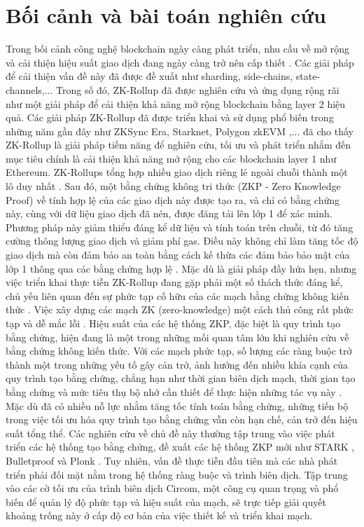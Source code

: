 \section{Bối cảnh và bài toán nghiên cứu}
Trong bối cảnh công nghệ blockchain ngày càng phát triển, nhu cầu về mở rộng \cite{song2024advancing} và cải thiện hiệu suất giao dịch đang ngày càng trở nên cấp thiết  \cite{etherscan_pending} \cite{etherscan_token}. Các giải pháp để cải thiện vấn đề này đã được đề xuất như sharding, side-chains, state-channels,... Trong số đó, ZK-Rollup đã được nghiên cứu và ứng dụng rộng rãi như một giải pháp để cải thiện khả năng mở rộng blockchain bằng layer 2 hiệu quả. Các giải pháp ZK-Rollup đã được triển khai và sử dụng phổ biến trong những năm gần đây như ZKSync Era, Starknet, Polygon zkEVM \cite{chaliasos2024analyzing},... đã cho thấy ZK-Rollup là giải pháp tiềm năng để nghiên cứu, tối ưu và phát triển nhắm đến mục tiêu chính là cải thiện khả năng mở rộng cho các blockchain layer 1 như Ethereum.
ZK-Rollups tổng hợp nhiều giao dịch riêng lẻ ngoài chuỗi thành một lô duy nhất \cite{thibault2022blockchain}. Sau đó, một bằng chứng không tri thức (ZKP - Zero Knowledge Proof) về tính hợp lệ của các giao dịch này được tạo ra, và chỉ có bằng chứng này, cùng với dữ liệu giao dịch đã nén, được đăng tải lên lớp 1 để xác minh. Phương pháp này giảm thiểu đáng kể dữ liệu và tính toán trên chuỗi, từ đó tăng cường thông lượng giao dịch và giảm phí gas. Điều này không chỉ làm tăng tốc độ giao dịch mà còn đảm bảo an toàn bằng cách kế thừa các đảm bảo bảo mật của lớp 1 thông qua các bằng chứng hợp lệ \cite{saif2024survey}.
Mặc dù là giải pháp đầy hứa hẹn, nhưng việc triển khai thực tiễn ZK-Rollup đang gặp phải một số thách thức đáng kể, chủ yếu liên quan đến sự phức tạp cố hữu của các mạch bằng chứng không kiến thức \cite{zhou2024leveraging}. Việc xây dựng các mạch ZK (zero-knowledge) một cách thủ công rất phức tạp và dễ mắc lỗi \cite{chaliasos2024sok}. Hiệu suất của các hệ thống ZKP, đặc biệt là quy trình tạo bằng chứng, hiện đang là một trong những mối quan tâm lớn khi nghiên cứu về bằng chứng không kiến thức. Với các mạch phức tạp, số lượng các ràng buộc trở thành một trong những yếu tố gây cản trở, ảnh hưởng đến nhiều khía cạnh của quy trình tạo bằng chứng, chẳng hạn như thời gian biên dịch mạch, thời gian tạo bằng chứng và mức tiêu thụ bộ nhớ cần thiết để thực hiện những tác vụ này \cite{belles2022circom}.
Mặc dù đã có nhiều nỗ lực nhằm tăng tốc tính toán bằng chứng, những tiến bộ trong việc tối ưu hóa quy trình tạo bằng chứng vẫn còn hạn chế, cản trở đến hiệu suất tổng thể. Các nghiên cứu về chủ đề này thường tập trung vào việc phát triển các hệ thống tạo bằng chứng, đề xuất các hệ thống ZKP mới \cite{gong2022analysis} như STARK \cite{ben2018scalable}, Bulletproof \cite{bunz2018bulletproofs} và Plonk \cite{gabizon2019plonk}. Tuy nhiên, vấn đề thực tiễn đầu tiên mà các nhà phát triển phải đối mặt nằm trong hệ thống ràng buộc và trình biên dịch. Tập trung vào các cờ tối ưu của trình biên dịch Circom, một công cụ quan trọng và phổ biến để quản lý độ phức tạp và hiệu suất của mạch, sẽ trực tiếp giải quyết khoảng trống này ở cấp độ cơ bản của việc thiết kế và triển khai mạch.

